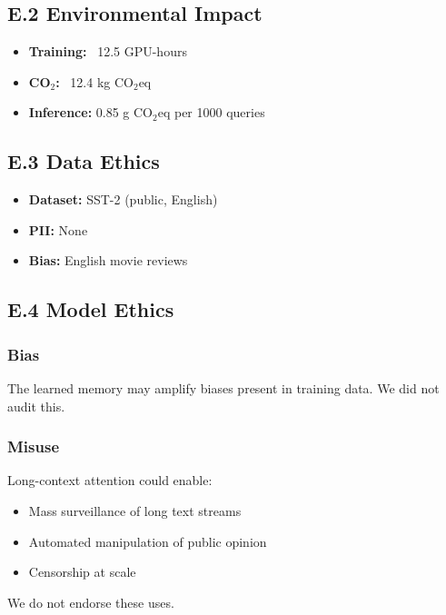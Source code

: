 \subsection{E.2 Environmental Impact}

\begin{itemize}
\item \textbf{Training:} ~12.5 GPU-hours
\item \textbf{CO$_2$:} ~12.4 kg CO$_2$eq
\item \textbf{Inference:} 0.85 g CO$_2$eq per 1000 queries

\end{itemize}
\subsection{E.3 Data Ethics}

\begin{itemize}
\item \textbf{Dataset:} SST-2 (public, English)
\item \textbf{PII:} None
\item \textbf{Bias:} English movie reviews

\end{itemize}
\subsection{E.4 Model Ethics}

\subsubsection{Bias}

The learned memory may amplify biases present in training data. We did 
not audit this.

\subsubsection{Misuse}

Long-context attention could enable:

\begin{itemize}
\item Mass surveillance of long text streams
\item Automated manipulation of public opinion
\item Censorship at scale

\end{itemize}
We do not endorse these uses.

